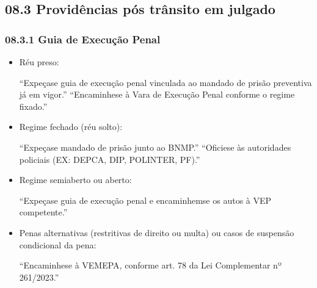 \documentclass[letterpaper,10pt,brazil]{sphinxmanual}
\begin{document}
\subsection{08.3 \textendash{} Providências pós trânsito em julgado}
\label{\detokenize{08sentenca_disposicoesfinais:providencias-pos-transito-em-julgado}}

\subsubsection{08.3.1 \textendash{} Guia de Execução Penal}
\label{\detokenize{08sentenca_disposicoesfinais:guia-de-execucao-penal}}\begin{itemize}
\item {} 
\sphinxAtStartPar
Réu preso:

\begin{sphinxVerbatim}[commandchars=\\\{\}]
“Expeça\PYGZhy{}se guia de execução penal vinculada ao mandado de prisão preventiva já em vigor.”
“Encaminhe\PYGZhy{}se à Vara de Execução Penal conforme o regime fixado.”
\end{sphinxVerbatim}

\item {} 
\sphinxAtStartPar
Regime fechado (réu solto):

\begin{sphinxVerbatim}[commandchars=\\\{\}]
“Expeça\PYGZhy{}se mandado de prisão junto ao BNMP.”
“Oficie\PYGZhy{}se às autoridades policiais (EX: DEPCA, DIP, POLINTER, PF).”
\end{sphinxVerbatim}

\item {} 
\sphinxAtStartPar
Regime semiaberto ou aberto:

\begin{sphinxVerbatim}[commandchars=\\\{\}]
“Expeça\PYGZhy{}se guia de execução penal e encaminhem\PYGZhy{}se os autos à VEP competente.”
\end{sphinxVerbatim}

\item {} 
\sphinxAtStartPar
Penas alternativas (restritivas de direito ou multa) ou casos de suspensão condicional da pena:

\begin{sphinxVerbatim}[commandchars=\\\{\}]
“Encaminhe\PYGZhy{}se à VEMEPA, conforme art. 78 da Lei Complementar nº 261/2023.”
\end{sphinxVerbatim}

\end{itemize}
\end{document}
